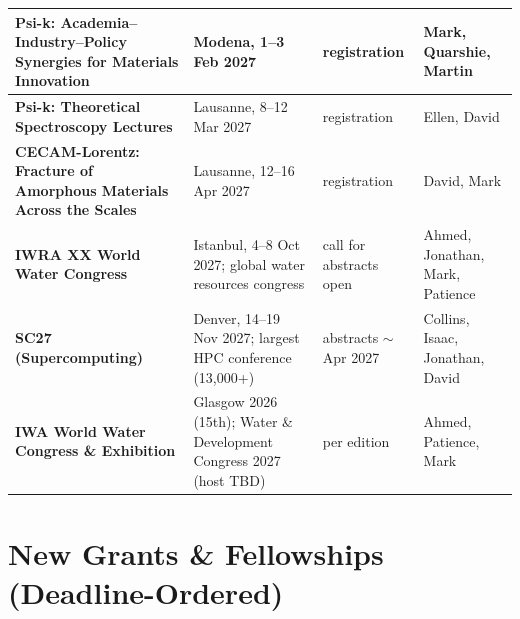 \documentclass[11pt,a4paper]{article}
\begin{document}
\begin{longtable}{@{}p{3.3cm}p{5.6cm}p{2.2cm}p{2.8cm}@{}}
\midrule
\textbf{Psi-k: Academia--Industry--Policy Synergies for Materials Innovation} & Modena, 1--3 Feb 2027 & registration & Mark, Quarshie, Martin \\
\midrule
\textbf{Psi-k: Theoretical Spectroscopy Lectures} & Lausanne, 8--12 Mar 2027 & registration & Ellen, David \\
\midrule
\textbf{CECAM-Lorentz: Fracture of Amorphous Materials Across the Scales} & Lausanne, 12--16 Apr 2027 & registration & David, Mark \\
\midrule
\textbf{IWRA XX World Water Congress} & Istanbul, 4--8 Oct 2027; global water resources congress & call for abstracts open & Ahmed, Jonathan, Mark, Patience \\
\midrule
\textbf{SC27 (Supercomputing)} & Denver, 14--19 Nov 2027; largest HPC conference (13{,}000+) & abstracts $\sim$Apr 2027 & Collins, Isaac, Jonathan, David \\
\midrule
\textbf{IWA World Water Congress \& Exhibition} & Glasgow 2026 (15th); Water \& Development Congress 2027 (host TBD) & per edition & Ahmed, Patience, Mark \\
\bottomrule
\end{longtable}

\section{New Grants \& Fellowships (Deadline-Ordered)}
\end{document}
